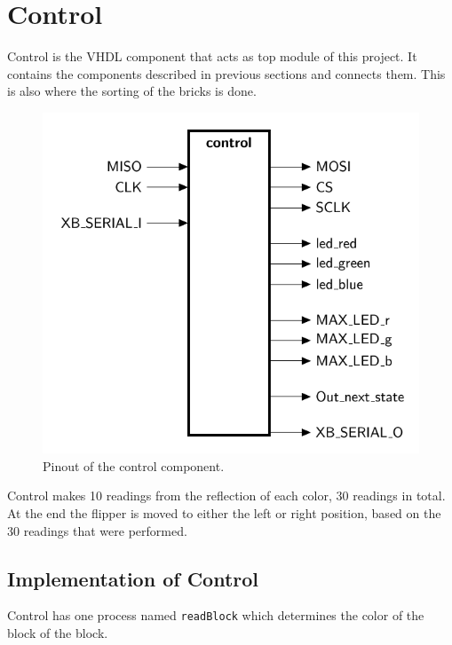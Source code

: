 \section{Control}
\label{sec:control}
Control is the VHDL component that acts as top module of this project. 
It contains the components described in previous sections and connects them.
This is also where the sorting of the bricks is done.
\begin{figure}[h!]
	\centering
	\includegraphics[scale=0.4]{images/ent_control}
	\caption{Pinout of the control component.}
	\label{fig:pinoutcontrol}
\end{figure}
Control makes 10 readings from the reflection of each color, 30 readings in total. 
At the end the flipper is moved to either the left or right position, based on the 30 readings that were performed.

\subsection{Implementation of Control}


Control has  one process named \texttt{readBlock} which determines the color of the block of the block. \\


